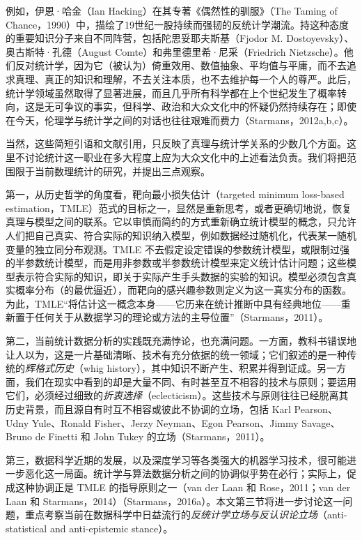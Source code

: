 例如，伊恩·哈金（Ian Hacking）在其专著《偶然性的驯服》（The Taming of Chance，1990）中，描绘了19世纪一股持续而强韧的反统计学潮流。持这种态度的重要知识分子来自不同阵营，包括陀思妥耶夫斯基（Fjodor M. Dostoyevsky）、奥古斯特·孔德（August Comte）和弗里德里希·尼采（Friedrich Nietzsche）。他们反对统计学，因为它（被认为）倚重效用、数值抽象、平均值与平庸，而不去追求真理、真正的知识和理解，不去关注本质，也不去维护每一个人的尊严。此后，统计学领域虽然取得了显著进展，而且几乎所有科学都在上个世纪发生了概率转向，这是无可争议的事实，但科学、政治和大众文化中的怀疑仍然持续存在；即使在今天，伦理学与统计学之间的对话也往往艰难而费力（Starmans，2012a,b,c）。

当然，这些简短引语和文献引用，只反映了真理与统计学关系的少数几个方面。这里不讨论统计这一职业在多大程度上应为大众文化中的上述看法负责。我们将把范围限于当前数理统计的研究，并提出三点观察。

第一，从历史哲学的角度看，靶向最小损失估计（targeted minimum loss-based estimation，TMLE）范式的目标之一，显然是重新思考，或者更确切地说，恢复真理与模型之间的联系。它以审慎而简约的方式重新确立统计模型的概念，只允许人们把自己真实、符合实际的知识纳入模型，例如数据经过随机化，代表某一随机变量的独立同分布观测。TMLE 不去假定设定错误的参数统计模型，或限制过强的半参数统计模型，而是用非参数或半参数统计模型来定义统计估计问题；这些模型表示符合实际的知识，即关于实际产生手头数据的实验的知识。模型必须包含真实概率分布（的最优逼近），而靶向的感兴趣参数则定义为这一真实分布的函数。为此，TMLE“将估计这一概念本身——它历来在统计推断中具有经典地位——重新置于任何关于从数据学习的理论或方法的主导位置”（Starmans，2011）。

第二，当前统计数据分析的实践既充满悖论，也充满问题。一方面，教科书错误地让人以为，这是一片基础清晰、技术有充分依据的统一领域；它们叙述的是一种传统的\emph{辉格式历史}（whig history），其中知识不断产生、积累并得到证成。另一方面，我们在现实中看到的却是大量不同、有时甚至互不相容的技术与原则；要运用它们，必须经过细致的\emph{折衷选择}（eclecticism）。这些技术与原则往往已经脱离其历史背景，而且源自有时互不相容或彼此不协调的立场，包括 Karl Pearson、Udny Yule、Ronald Fisher、Jerzy Neyman、Egon Pearson、Jimmy Savage、Bruno de Finetti 和 John Tukey 的立场（Starmans，2011）。

第三，数据科学近期的发展，以及深度学习等各类强大的机器学习技术，很可能进一步恶化这一局面。统计学与算法数据分析之间的协调似乎势在必行；实际上，促成这种协调正是 TMLE 的指导原则之一（van der Laan 和 Rose，2011；van der Laan 和 Starmans，2014）（Starmans，2016a）。本文第三节将进一步讨论这一问题，重点考察当前在数据科学中日益流行的\emph{反统计学立场与反认识论立场}（anti-statistical and anti-epistemic stance）。
